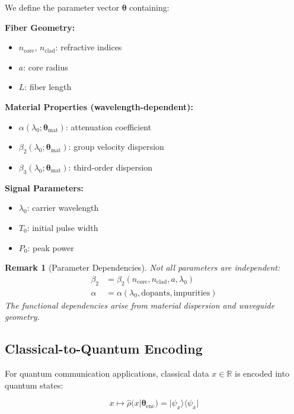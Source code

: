 \documentclass[12pt,a4paper]{article}
\newtheorem{remark}{Remark}
\begin{document}
We define the parameter vector $\boldsymbol{\theta}$ containing:

\textbf{Fiber Geometry:}
\begin{itemize}[leftmargin=*]
\item $n_{\text{core}}$, $n_{\text{clad}}$: refractive indices
\item $a$: core radius
\item $L$: fiber length
\end{itemize}

\textbf{Material Properties (wavelength-dependent):}
\begin{itemize}[leftmargin=*]
\item $\alpha(\lambda_0; \boldsymbol{\theta}_{\text{mat}})$: attenuation coefficient
\item $\beta_2(\lambda_0; \boldsymbol{\theta}_{\text{mat}})$: group velocity dispersion
\item $\beta_3(\lambda_0; \boldsymbol{\theta}_{\text{mat}})$: third-order dispersion
\end{itemize}

\textbf{Signal Parameters:}
\begin{itemize}[leftmargin=*]
\item $\lambda_0$: carrier wavelength
\item $T_0$: initial pulse width
\item $P_0$: peak power
\end{itemize}

\begin{remark}[Parameter Dependencies]
Not all parameters are independent:
\begin{align}
\beta_2 &= \beta_2(n_{\text{core}}, n_{\text{clad}}, a, \lambda_0) \\
\alpha &= \alpha(\lambda_0, \text{dopants}, \text{impurities})
\end{align}
The functional dependencies arise from material dispersion and waveguide geometry.
\end{remark}

\subsection{Classical-to-Quantum Encoding}

For quantum communication applications, classical data $x \in \mathbb{R}$ is encoded into quantum states:

\begin{equation}
x \mapsto \hat{\rho}(x|\boldsymbol{\theta}_{\text{enc}}) = |\psi_x\rangle\langle\psi_x|
\end{equation}
\end{document}
